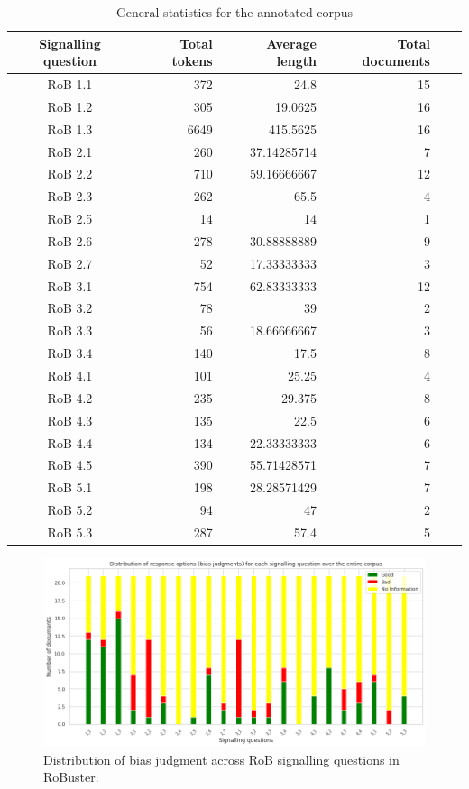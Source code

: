 \documentclass[sn-mathphys,Numbered]{sn-jnl}%
\theoremstyle{thmstyleone}%
\theoremstyle{thmstyletwo}%
\theoremstyle{thmstylethree}%
\begin{document}
%
%
%
\begin{table}[htb]
    \centering
    \caption{General statistics for the annotated corpus}
    \label{table:stats}
    \begin{tabular}{crrrrr}
    \hline
        Signalling question & Total tokens & Average length & Total documents \\ \hline
        RoB 1.1 & 372 & 24.8 & 15 \\ 
        RoB 1.2 & 305 & 19.0625 & 16 \\ 
        RoB 1.3 & 6649 & 415.5625 & 16 \\ 
        RoB 2.1 & 260 & 37.14285714 & 7 \\ 
        RoB 2.2 & 710 & 59.16666667 & 12 \\ 
        RoB 2.3 & 262 & 65.5 & 4 \\ 
        RoB 2.5 & 14 & 14 & 1 \\ 
        RoB 2.6 & 278 & 30.88888889 & 9 \\ 
        RoB 2.7 & 52 & 17.33333333 & 3 \\ 
        RoB 3.1 & 754 & 62.83333333 & 12 \\ 
        RoB 3.2 & 78 & 39 & 2 \\ 
        RoB 3.3 & 56 & 18.66666667 & 3 \\ 
        RoB 3.4 & 140 & 17.5 & 8 \\ 
        RoB 4.1 & 101 & 25.25 & 4 \\ 
        RoB 4.2 & 235 & 29.375 & 8 \\ 
        RoB 4.3 & 135 & 22.5 & 6 \\ 
        RoB 4.4 & 134 & 22.33333333 & 6 \\ 
        RoB 4.5 & 390 & 55.71428571 & 7 \\ 
        RoB 5.1 & 198 & 28.28571429 & 7 \\ 
        RoB 5.2 & 94 & 47 & 2 \\ 
        RoB 5.3 & 287 & 57.4 & 5 \\ \hline
    \end{tabular}
\end{table}
%
%
%

%
%
%
\begin{figure}[htb]
    \centering
    \includegraphics[width=0.90\columnwidth]{figures/judgment_dist.png}
    \caption{Distribution of bias judgment across RoB signalling questions in RoBuster.}
    \label{fig:rob_information}
\end{figure}
%
%
%
\end{document}
